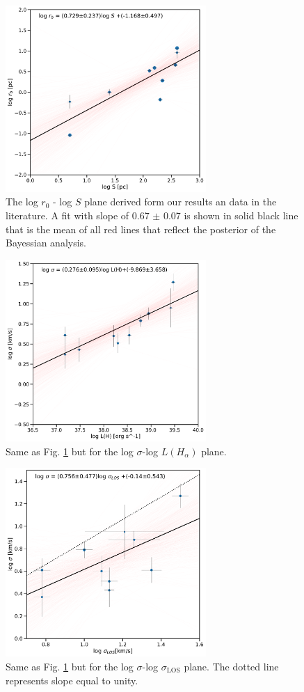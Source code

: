 \documentclass[fleqn,usenatbib, useAMS, a4paper]{mnras}
\begin{document}
\begin{figure}
\centering 
\includegraphics[width=3in]{Figures/rvsS}
\caption{The log \(r_0\) - log \(S\) plane derived form our results an data in the literature. A fit with slope of 0.67 $\pm$ 0.07 is shown in solid black line that is the mean of all red lines that reflect the posterior of the Bayessian analysis. }
\label{fig:rvsR}
\end{figure}

\begin{figure}
\centering 
\includegraphics[width=3in]{Figures/svsL}
\caption{Same as Fig. \ref{fig:rvsR} but for the log $\sigma$-log $L(H_{\alpha})$ plane.}
\label{fig:sigvsl}
\end{figure}

\begin{figure}
\centering 
\includegraphics[width=3in]{Figures/svss.pdf}
\caption{Same as Fig. \ref{fig:rvsR} but for the log $\sigma$-log $\sigma_{\text{LOS}}$ plane. The dotted line represents slope equal to unity.}
\label{fig:svss}
\end{figure}
\end{document}
